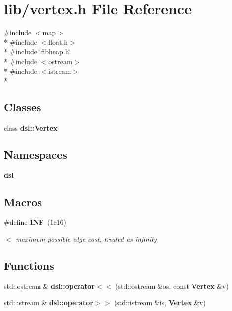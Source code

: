 \section{lib/vertex.h File Reference}
\label{vertex_8h}
{\ttfamily \#include $<$map$>$}\\*
{\ttfamily \#include $<$float.\-h$>$}\\*
{\ttfamily \#include \char`\"{}fibheap.\-h\char`\"{}}\\*
{\ttfamily \#include $<$ostream$>$}\\*
{\ttfamily \#include $<$istream$>$}\\*
\subsection*{Classes}
\begin{DoxyCompactItemize}
\item 
class {\bf dsl\-::\-Vertex}
\end{DoxyCompactItemize}
\subsection*{Namespaces}
\begin{DoxyCompactItemize}
\item 
{\bf dsl}
\end{DoxyCompactItemize}
\subsection*{Macros}
\begin{DoxyCompactItemize}
\item 
\#define {\bf I\-N\-F}~(1e16)
\begin{DoxyCompactList}\small\item\em $<$ maximum possible edge cost, treated as infinity \end{DoxyCompactList}\end{DoxyCompactItemize}
\subsection*{Functions}
\begin{DoxyCompactItemize}
\item 
std\-::ostream \& {\bf dsl\-::operator$<$$<$} (std\-::ostream \&os, const {\bf Vertex} \&v)
\item 
std\-::istream \& {\bf dsl\-::operator$>$$>$} (std\-::istream \&is, {\bf Vertex} \&v)
\end{DoxyCompactItemize}


